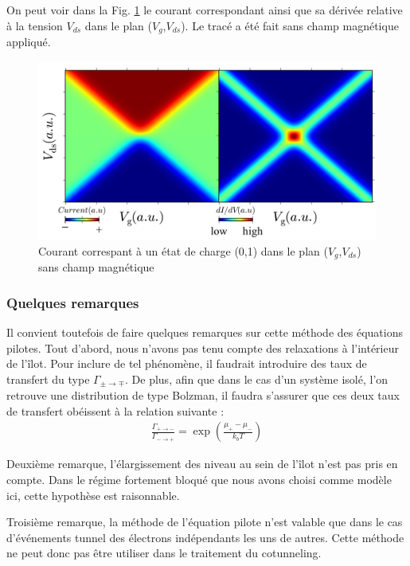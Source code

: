 On peut voir dans la Fig. \ref{SimulatedCoulombMap} le courant correspondant ainsi que sa dérivée relative à la tension $V_{ds}$ dans le plan ($V_g$,$V_{ds}$). Le tracé a été fait sans champ magnétique appliqué.


\begin{figure}
\begin{center}
\includegraphics[scale=0.5]{Annexe3/figure1/figure4.pdf} 
\caption{Courant correspant à un état de charge (0,1) dans le plan ($V_g$,$V_{ds}$) sans champ magnétique}
\label{SimulatedCoulombMap}
\end{center}
\end{figure}

\subsubsection{Quelques remarques}
Il convient toutefois de faire quelques remarques sur cette méthode des équations pilotes. Tout d'abord, nous n'avons pas tenu compte des relaxations à l'intérieur de l'\^ilot. Pour inclure de tel phénomène, il faudrait introduire des taux de transfert du type $\Gamma_{\pm \rightarrow \mp}$. De plus, afin que dans le cas d'un système isolé, l'on retrouve une distribution de type Bolzman, il faudra s'assurer que ces deux taux de transfert obéissent à la relation suivante :
\begin{eqnarray}
\frac{\Gamma_{+ \rightarrow -}}{\Gamma_{- \rightarrow +}} = \exp(\frac{\mu_{+}- \mu_{-}}{k_bT}) \nonumber
\end{eqnarray}

Deuxième remarque, l'élargissement des niveau au sein de l'\^ilot n'est pas pris en compte. Dans le régime fortement bloqué que nous avons choisi comme modèle ici, cette hypothèse est raisonnable. 

Troisième remarque, la méthode de l'équation pilote n'est valable que dans le cas d’événements tunnel des électrons indépendants les uns de autres. Cette méthode ne peut donc pas \^etre utiliser dans le traitement du cotunneling.
